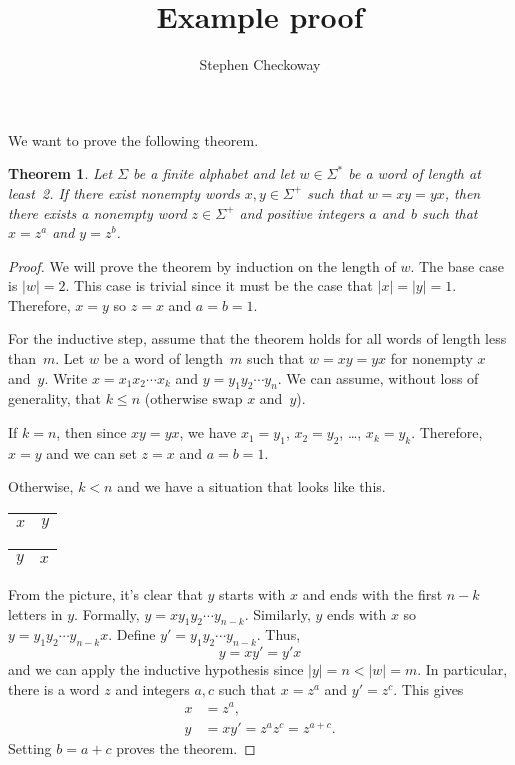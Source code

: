 \documentclass{article}
\title{Example proof}
\author{Stephen Checkoway}
\newtheorem*{thm}{Theorem}
\begin{document}
\maketitle

We want to prove the following theorem.
\begin{thm}
Let $\Sigma$ be a finite alphabet and let $w\in\Sigma^*$ be a word of
length at least~2. If there exist nonempty words $x,y\in\Sigma^+$
such that $w=xy=yx$, then there exists a nonempty word $z\in\Sigma^+$
and positive integers $a$ and~$b$ such that $x=z^a$ and $y=z^b$.
\end{thm}

\begin{proof}
We will prove the theorem by induction on the length of $w$. The base
case is $|w|=2$. This case is trivial since it must be the case that
$|x|=|y|=1$. Therefore, $x=y$ so $z=x$ and $a=b=1$.

For the inductive step, assume that the theorem holds for all words of
length less than~$m$. Let $w$ be a word of length~$m$ such that
$w=xy=yx$ for nonempty $x$ and~$y$. Write $x=x_1 x_2 \cdots x_k$ and
$y=y_1 y_2 \cdots y_n$. We can assume, without loss of generality,
that $k\le n$ (otherwise swap $x$ and~$y$).

If $k=n$, then since $xy=yx$, we have $x_1=y_1$, $x_2=y_2$, \ldots,
$x_k=y_k$. Therefore, $x=y$ and we can set $z=x$ and $a=b=1$.

Otherwise, $k<n$ and we have a situation that looks like this.

\begin{center}
\begin{tabular}{|C{2cm}|C{3cm}|}
\hline
$x$ & $y$\\
\hline
\end{tabular}

\vspace{.5\baselineskip}

\begin{tabular}{|C{3cm}|C{2cm}|}
\hline
$y$ & $x$\\
\hline
\end{tabular}
\end{center}

From the picture, it's clear that $y$ starts with $x$ and ends
with the first $n-k$ letters in $y$. Formally, $y=xy_1y_2\cdots
y_{n-k}$. Similarly, $y$ ends with $x$ so $y=y_1y_2\cdots y_{n-k}x$.
Define $y'=y_1y_2\cdots y_{n-k}$. Thus,
\[ y=xy'=y'x \]
and we can apply the inductive hypothesis since $|y|=n<|w|=m$. In
particular, there is a word $z$ and integers $a,c$ such that $x=z^a$
and $y'=z^c$. This gives
\begin{align*}
x&=z^a,\\
y&=xy'=z^az^c=z^{a+c}.
\end{align*}
Setting $b=a+c$ proves the theorem.
\end{proof}
\end{document}
